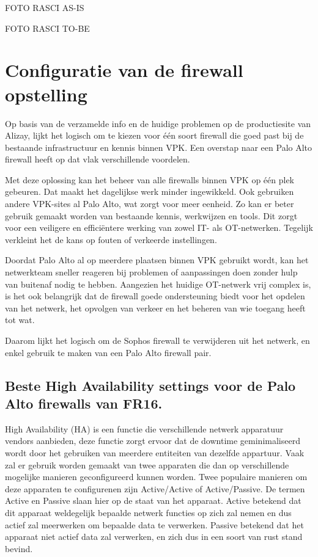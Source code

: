FOTO RASCI AS-IS

FOTO RASCI TO-BE



\chapter{Configuratie van de firewall opstelling}

Op basis van de verzamelde info en de huidige problemen op de productiesite van Alizay, lijkt het logisch om te kiezen voor één soort firewall die goed past bij de bestaande infrastructuur en kennis binnen VPK. Een overstap naar een Palo Alto firewall heeft op dat vlak verschillende voordelen.

Met deze oplossing kan het beheer van alle firewalls binnen VPK op één plek gebeuren. Dat maakt het dagelijkse werk minder ingewikkeld. Ook gebruiken andere VPK-sites al Palo Alto, wat zorgt voor meer eenheid. Zo kan er beter gebruik gemaakt worden van bestaande kennis, werkwijzen en tools. Dit zorgt voor een veiligere en efficiëntere werking van zowel IT- als OT-netwerken. Tegelijk verkleint het de kans op fouten of verkeerde instellingen.

Doordat Palo Alto al op meerdere plaatsen binnen VPK gebruikt wordt, kan het netwerkteam sneller reageren bij problemen of aanpassingen doen zonder hulp van buitenaf nodig te hebben. Aangezien het huidige OT-netwerk vrij complex is, is het ook belangrijk dat de firewall goede ondersteuning biedt voor het opdelen van het netwerk, het opvolgen van verkeer en het beheren van wie toegang heeft tot wat.

Daarom lijkt het logisch om de Sophos firewall te verwijderen uit het netwerk, en enkel gebruik te maken van een Palo Alto firewall pair.

\newpage

\section{Beste High Availability settings voor de Palo Alto firewalls van FR16.}


High Availability (HA) is een functie die verschillende netwerk apparatuur vendors aanbieden, deze functie zorgt ervoor dat de downtime geminimaliseerd wordt door het gebruiken van meerdere entiteiten van dezelfde appartuur. Vaak zal er gebruik worden gemaakt van twee apparaten die dan op verschillende mogelijke manieren geconfigureerd kunnen worden. Twee populaire manieren om deze apparaten te configurenen zijn Active/Active of Active/Passive. De termen Active en Passive slaan hier op de staat van het apparaat. Active betekend dat dit apparaat weldegelijk bepaalde netwerk functies op zich zal nemen en dus actief zal meerwerken om bepaalde data te verwerken. Passive betekend dat het apparaat niet actief data zal verwerken, en zich dus in een soort van rust stand bevind.

